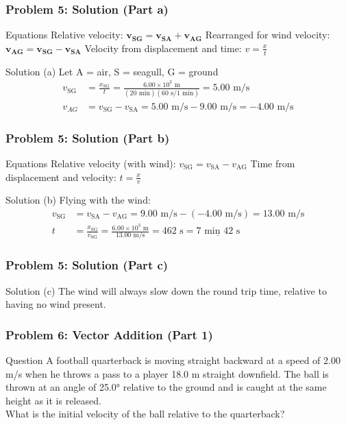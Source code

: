 \documentclass{beamer}
\begin{document}
\begin{frame}
\frametitle{Problem 5: Solution (Part a)}
\begin{block}{Equations}
Relative velocity: $\mathbf{v}_{\mathbf{SG}} = \mathbf{v}_{\mathbf{SA}} + \mathbf{v}_{\mathbf{AG}}$
Rearranged for wind velocity: $\mathbf{v}_{\mathbf{AG}} = \mathbf{v}_{\mathbf{SG}} - \mathbf{v}_{\mathbf{SA}}$
Velocity from displacement and time: $v = \frac{x}{t}$
\end{block}
\begin{block}{Solution}
(a) Let A = air, S = seagull, G = ground
\begin{align*}
v_{\text{SG}} &= \frac{x_{\text{SG}}}{t} = \frac{6.00 \times 10^3 \text{ m}}{(20 \text{ min})(60 \text{ s/1 min})} = 5.00 \text{ m/s}\\
v_{AG} &= v_{\text{SG}} - v_{\text{SA}} = 5.00 \text{ m/s} - 9.00 \text{ m/s} = -4.00 \text{ m/s}
\end{align*}
\end{block}
\end{frame}

\begin{frame}
\frametitle{Problem 5: Solution (Part b)}
\begin{block}{Equations}
Relative velocity (with wind): $v_{\text{SG}} = v_{\text{SA}} - v_{\text{AG}}$
Time from displacement and velocity: $t = \frac{x}{v}$
\end{block}
\begin{block}{Solution}
(b) Flying with the wind:
\begin{align*}
v_{\text{SG}} &= v_{\text{SA}} - v_{\text{AG}} = 9.00 \text{ m/s} - (-4.00 \text{ m/s}) = 13.00 \text{ m/s}\\
t &= \frac{x_{\text{SG}}}{v_{\text{SG}}} = \frac{6.00 \times 10^3 \text{ m}}{13.00 \text{ m/s}} = 462 \text{ s} = \underline{7 \text{ min} \text{ 42 s}}
\end{align*}
\end{block}
\end{frame}

\begin{frame}
\frametitle{Problem 5: Solution (Part c)}
\begin{block}{Solution}
(c) The wind will always slow down the round trip time, relative to having no wind present.
\end{block}
\end{frame}

\begin{frame}
\frametitle{Problem 6: Vector Addition (Part 1)}
\begin{block}{Question}
A football quarterback is moving straight backward at a speed of 2.00 m/s when he throws a pass to a player 18.0 m straight downfield. The ball is thrown at an angle of 25.0° relative to the ground and is caught at the same height as it is released. \\What is the initial velocity of the ball relative to the quarterback?
\end{block}
\end{frame}
\end{document}

